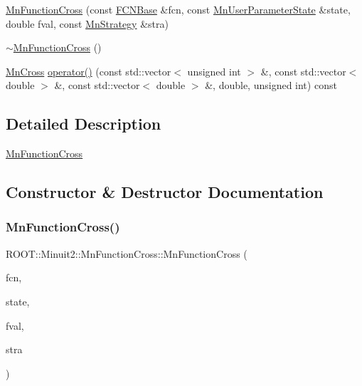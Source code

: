 \begin{DoxyCompactItemize}
\item 
\mbox{\hyperlink{classROOT_1_1Minuit2_1_1MnFunctionCross_a553cffc846a7ffc94ef777c660862f80}{Mn\+Function\+Cross}} (const \mbox{\hyperlink{classROOT_1_1Minuit2_1_1FCNBase}{F\+C\+N\+Base}} \&fcn, const \mbox{\hyperlink{classROOT_1_1Minuit2_1_1MnUserParameterState}{Mn\+User\+Parameter\+State}} \&state, double fval, const \mbox{\hyperlink{classROOT_1_1Minuit2_1_1MnStrategy}{Mn\+Strategy}} \&stra)
\item 
\mbox{\hyperlink{classROOT_1_1Minuit2_1_1MnFunctionCross_a6eddadf7793152d1c7a4604b2f374035}{$\sim$\+Mn\+Function\+Cross}} ()
\item 
\mbox{\hyperlink{classROOT_1_1Minuit2_1_1MnCross}{Mn\+Cross}} \mbox{\hyperlink{classROOT_1_1Minuit2_1_1MnFunctionCross_ace9b7e1472f82cb23525365e5f061477}{operator()}} (const std\+::vector$<$ unsigned int $>$ \&, const std\+::vector$<$ double $>$ \&, const std\+::vector$<$ double $>$ \&, double, unsigned int) const
\end{DoxyCompactItemize}


\subsection{Detailed Description}
\mbox{\hyperlink{classROOT_1_1Minuit2_1_1MnFunctionCross}{Mn\+Function\+Cross}} 

\subsection{Constructor \& Destructor Documentation}
\mbox{\label{classROOT_1_1Minuit2_1_1MnFunctionCross_a553cffc846a7ffc94ef777c660862f80}} 
\subsubsection{\texorpdfstring{MnFunctionCross()}{MnFunctionCross()}\hspace{0.1cm}{\footnotesize\ttfamily [1/3]}}
{\footnotesize\ttfamily R\+O\+O\+T\+::\+Minuit2\+::\+Mn\+Function\+Cross\+::\+Mn\+Function\+Cross (\begin{DoxyParamCaption}\item[{const \mbox{\hyperlink{classROOT_1_1Minuit2_1_1FCNBase}{F\+C\+N\+Base}} \&}]{fcn,  }\item[{const \mbox{\hyperlink{classROOT_1_1Minuit2_1_1MnUserParameterState}{Mn\+User\+Parameter\+State}} \&}]{state,  }\item[{double}]{fval,  }\item[{const \mbox{\hyperlink{classROOT_1_1Minuit2_1_1MnStrategy}{Mn\+Strategy}} \&}]{stra }\end{DoxyParamCaption})\hspace{0.3cm}{\ttfamily [inline]}}

